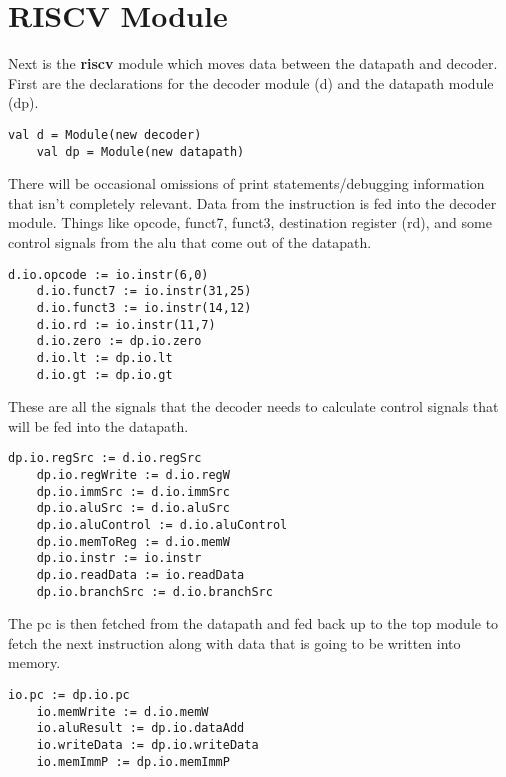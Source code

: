 \documentclass[12pt, letterpaper]{report}
\begin{document}
\section{RISCV Module}
Next is the \textbf{riscv} module which moves data between the datapath and decoder. First are the declarations for the decoder module (d)
and the datapath module (dp).

\begin{lstlisting}[style=scala]
    val d = Module(new decoder)
    val dp = Module(new datapath)
\end{lstlisting}

There will be occasional omissions of print statements/debugging information that isn't completely relevant.
Data from the instruction is fed into the decoder module. Things like opcode, funct7, funct3, destination register (rd), 
and some control signals from the alu that come out of the datapath.

\begin{lstlisting}[style=scala]
    d.io.opcode := io.instr(6,0)
    d.io.funct7 := io.instr(31,25)
    d.io.funct3 := io.instr(14,12)
    d.io.rd := io.instr(11,7)
    d.io.zero := dp.io.zero
    d.io.lt := dp.io.lt
    d.io.gt := dp.io.gt
\end{lstlisting}

These are all the signals that the decoder needs to calculate control signals that will be fed into the datapath. 

\begin{lstlisting}[style=scala]
    dp.io.regSrc := d.io.regSrc
    dp.io.regWrite := d.io.regW
    dp.io.immSrc := d.io.immSrc
    dp.io.aluSrc := d.io.aluSrc
    dp.io.aluControl := d.io.aluControl
    dp.io.memToReg := d.io.memW
    dp.io.instr := io.instr
    dp.io.readData := io.readData
    dp.io.branchSrc := d.io.branchSrc
\end{lstlisting}

The pc is then fetched from the datapath and fed back up to the top module to fetch the next instruction along with data
that is going to be written into memory. 

\begin{lstlisting}[style=scala]
    io.pc := dp.io.pc
    io.memWrite := d.io.memW
    io.aluResult := dp.io.dataAdd
    io.writeData := dp.io.writeData
    io.memImmP := dp.io.memImmP
\end{lstlisting}
\end{document}
